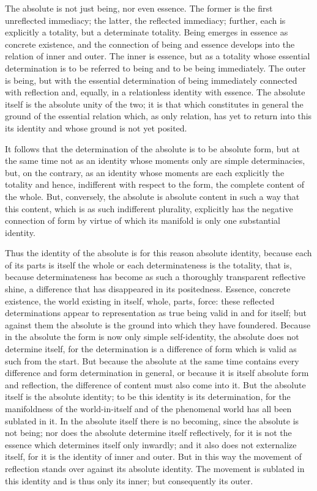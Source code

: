 The absolute is not just being, nor even essence.
The former is the first unreflected immediacy;
the latter, the reflected immediacy;
further, each is explicitly a totality,
but a determinate totality.
Being emerges in essence as concrete existence,
and the connection of being and essence develops
into the relation of inner and outer.
The inner is essence, but as a totality
whose essential determination is
to be referred to being and to be being immediately.
The outer is being, but with the essential determination of
being immediately connected with reflection
and, equally, in a relationless identity with essence.
The absolute itself is the absolute unity of the two;
it is that which constitutes in general
the ground of the essential relation
which, as only relation, has yet
to return into this its identity
and whose ground is not yet posited.

It follows that the determination of
the absolute is to be absolute form,
but at the same time not as an identity
whose moments only are simple determinacies,
but, on the contrary, as an identity
whose moments are each explicitly the totality
and hence, indifferent with respect to the form,
the complete content of the whole.
But, conversely, the absolute is absolute content
in such a way that this content,
which is as such indifferent plurality,
explicitly has the negative connection of form
by virtue of which its manifold is
only one substantial identity.

Thus the identity of the absolute is
for this reason absolute identity,
because each of its parts is itself the whole
or each determinateness is the totality, that is,
because determinateness has become as such
a thoroughly transparent reflective shine,
a difference that has disappeared in its positedness.
Essence, concrete existence, the world existing in itself,
whole, parts, force:
these reflected determinations appear to representation
as true being valid in and for itself;
but against them the absolute is the ground
into which they have foundered.
Because in the absolute the form is
now only simple self-identity,
the absolute does not determine itself,
for the determination is a difference of form
which is valid as such from the start.
But because the absolute at the same time contains
every difference and form determination in general,
or because it is itself absolute form and reflection,
the difference of content must also come into it.
But the absolute itself is the absolute identity;
to be this identity is its determination,
for the manifoldness of the world-in-itself
and of the phenomenal world has all been sublated in it.
In the absolute itself there is no becoming,
since the absolute is not being;
nor does the absolute determine itself reflectively,
for it is not the essence which determines itself only inwardly;
and it also does not externalize itself,
for it is the identity of inner and outer.
But in this way the movement of reflection
stands over against its absolute identity.
The movement is sublated in this identity
and is thus only its inner;
but consequently its outer.

